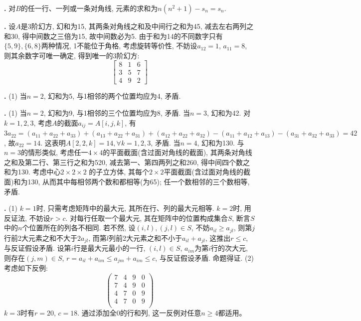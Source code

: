 \par \textbf{\thesoldes .} 对$B$的任一行、一列或一条对角线, 元素的求和为$n(n^2+1)-s_n=s_n$. 

\par \textbf{\thesoldes .} 设$A$是3阶幻方, 幻和为15, 其两条对角线之和及中间行之和为45, 减去左右两列之和30, 得中间数之三倍为15, 故中间数必为5. 由于和为14的不同数字只有$\{5,9\}, \{6,8\}$两种情况, 1不能位于角格, 考虑旋转等价性, 不妨设$a_{12}=1$, $a_{11}=8$, 则其余数字可唯一确定, 得到唯一的3阶幻方:
\begin{equation}
\left[\begin{array}{ccc}
8&1&6\\
3&5&7\\
4&9&2
\end{array}\right]
\end{equation}

\par \textbf{\thesoldes .} (1) 当$n=2$, 幻和为5, 与1相邻的两个位置均应为4, 矛盾. 

\par \textbf{\thesoldes .} (1) 当$n=2$, 幻和为9, 与1相邻的三个位置均应为8, 矛盾. 当$n=3$, 幻和为42. 对$k=1,2,3$, 考虑$A$的截面$a_{ij}=A[i,j,k]$, 有$3a_{22} = (a_{11}+a_{22}+a_{33})+(a_{13}+a_{22}+a_{31})+(a_{12}+a_{22}+a_{32})-(a_{11}+a_{12}+a_{13})-(a_{31}+a_{32}+a_{33})=42$, 故$a_{22}=14$. 这表明$A[2,2,k]=14, \forall k=1,2,3$, 矛盾. 当$n=4$, 幻和为130. 与$n=3$的情形类似, 考虑任一$4\times 4$的平面截面(含过面对角线的截面), 其两条对角线之和及第二行、第三行之和为520, 减去第一、第四两列之和260, 得中间四个数之和为130. 考虑中心$2\times 2\times 2$ 的子立方体, 其每个$2\times 2$平面截面(含过面对角线的截面)和为130, 从而其中每相邻两个数和都相等(为65); 任一个数相邻的三个数相等, 矛盾.

\par \textbf{\thesoldes .} (1) \cite{MaP} $k=1$时, 只需考虑矩阵中的最大元, 其所在行、列的最大元相等. $k=2$时, 用反证法, 不妨设$r>c$. 对每行任取一个最大元, 其在矩阵中的位置构成集合$S$, 断言$S$中的$n$个位置所在的列各不相同. 若不然, 设$(i,l),(j,l)\in S$, 不妨$a_{il}\ge a_{jl}$, 则第$j$行前2大元素之和不大于$2a_{jl}$, 而第$l$列前2大元素之和不小于$a_{il}+a_{jl}$, 这推出$r\le c$, 与反证假设矛盾. 设第$i$行是最大元最小的一行, $(i,l)\in S$, $a_{im}$为第$i$行的次大元, 则存在$(j,m)\in S$, $r=a_{il}+a_{im}\le a_{jm}+a_{im} \le c$, 与反证假设矛盾. 命题得证. (2) 考虑如下反例:
\begin{equation*}
\left(\begin{array}{cccc}
7 & 4 & 9 & 0 \\
7 & 4 & 9 & 0 \\
4 & 7 & 0 & 9 \\
4 & 7 & 0 & 9 \\
\end{array}\right)
\end{equation*}
$k=3$时有$r=20$, $c=18$. 通过添加全0的行和列, 这一反例对任意$n\ge 4$都适用。